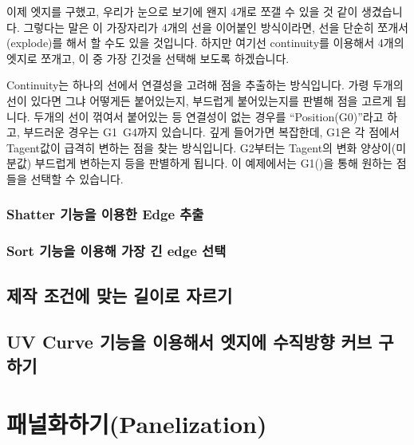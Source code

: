 \documentclass[11pt]{article}
\begin{document}
이제 엣지를 구했고, 우리가 눈으로 보기에 왠지 4개로 쪼갤 수 있을 것 같이 생겼습니다. 그렇다는 말은 이 가장자리가 4개의 선을 이어붙인 방식이라면, 선을 단순히 쪼개서(explode)를 해서 할 수도 있을 것입니다.
 하지만 여기선 continuity를 이용해서 4개의 엣지로 쪼개고, 이 중 가장 긴것을 선택해 보도록 하겠습니다.

Continuity는 하나의 선에서 연결성을 고려해 점을 추출하는 방식입니다. 가령 두개의 선이 있다면 그냐 어떻게든 붙어있는지, 부드럽게 붙어있는지를 판별해 점을 고르게 됩니다.
두개의 선이 꺾여서 붙어있는 등 연결성이 없는 경우를 ``Position(G0)''라고 하고, 부드러운 경우는 G1~G4까지 있습니다. 깊게 들어가면 복잡한데, G1은 각 점에서 Tagent값이 급격히 변하는 점을 찾는 방식입니다.
G2부터는 Tagent의 변화 양상이(미분값) 부드럽게 변하는지 등을 판별하게 됩니다. 이 예제에서는 G1()을 통해 원하는 점들을 선택할 수 있습니다.
\subsubsection{Shatter 기능을 이용한 Edge 추출}
\subsubsection{Sort 기능을 이용해 가장 긴 edge 선택}
\subsection{제작 조건에 맞는 길이로 자르기}
\subsection{UV Curve 기능을 이용해서 엣지에 수직방향 커브 구하기}
\section{패널화하기(Panelization)}
\end{document}

